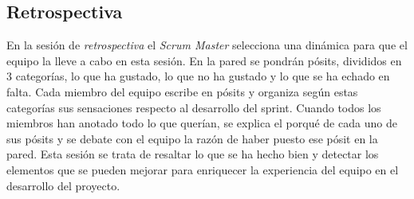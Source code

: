 \subsection{Retrospectiva}
\label{subsec:S1-Retrospectiva}

En la sesión de \emph{retrospectiva} el \emph{Scrum Master} selecciona una dinámica para que el equipo la lleve a cabo en esta sesión. En la pared se pondrán pósits, divididos en 3 categorías, lo que ha gustado, lo que no ha gustado y lo que se ha echado en falta. Cada miembro del equipo escribe en pósits y organiza según estas categorías sus sensaciones respecto al desarrollo del sprint. Cuando todos los miembros han anotado todo lo que querían, se explica el porqué de cada uno de sus pósits y se debate con el equipo la razón de haber puesto ese pósit en la pared. Esta sesión se trata de resaltar lo que se ha hecho bien y detectar los elementos que se pueden mejorar para enriquecer la experiencia del equipo en el desarrollo del proyecto.

